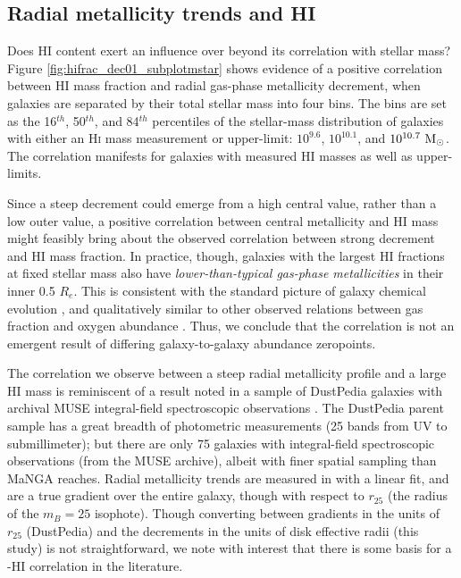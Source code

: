 \subsection{Radial metallicity trends and HI}

Does HI content exert an influence over \metdec beyond its correlation with stellar mass? Figure \ref{fig:hifrac_dec01_subplotmstar} shows evidence of a positive correlation between HI mass fraction and radial gas-phase metallicity decrement, when galaxies are separated by their total stellar mass into four bins. The bins are set as the 16$^{th}$, 50$^{th}$, and 84$^{th}$ percentiles of the stellar-mass distribution of galaxies with either an H\textsc{i} mass measurement or upper-limit: $10^{9.6}$, $10^{10.1}$, and $10^{10.7}~{\rm M_{\odot}}$. The correlation manifests for galaxies with measured HI masses as well as upper-limits.

Since a steep decrement could emerge from a high central value, rather than a low outer value, a positive correlation between central metallicity and HI mass might feasibly bring about the observed correlation between strong decrement and HI mass fraction. In practice, though, galaxies with the largest HI fractions at fixed stellar mass also have \emph{lower-than-typical gas-phase metallicities} in their inner 0.5 $R_e$. This is consistent with the standard picture of galaxy chemical evolution \citep{tinsley_72, tinsley_73}, and qualitatively similar to other observed relations between gas fraction and oxygen abundance \citep{hughes_2013-gfrac-met}. Thus, we conclude that the correlation is not an emergent result of differing galaxy-to-galaxy abundance zeropoints.

The correlation we observe between a steep radial metallicity profile and a large HI mass is reminiscent of a result noted in a sample of DustPedia galaxies with archival MUSE integral-field spectroscopic observations \citep{devis_2019_dustpedia}. The DustPedia parent sample has a great breadth of photometric measurements (25 bands from UV to submillimeter); but there are only 75 galaxies with integral-field spectroscopic observations (from the MUSE archive), albeit with finer spatial sampling than MaNGA reaches. Radial metallicity trends are measured in \citet{devis_2019_dustpedia} with a linear fit, and are a true gradient over the entire galaxy, though with respect to $r_{25}$ (the radius of the $m_B = 25$ isophote). Though converting between gradients in the units of $r_{25}$ (DustPedia) and the decrements in the units of disk effective radii (this study) is not straightforward, we note with interest that there is some basis for a \metdec-HI correlation in the literature.

